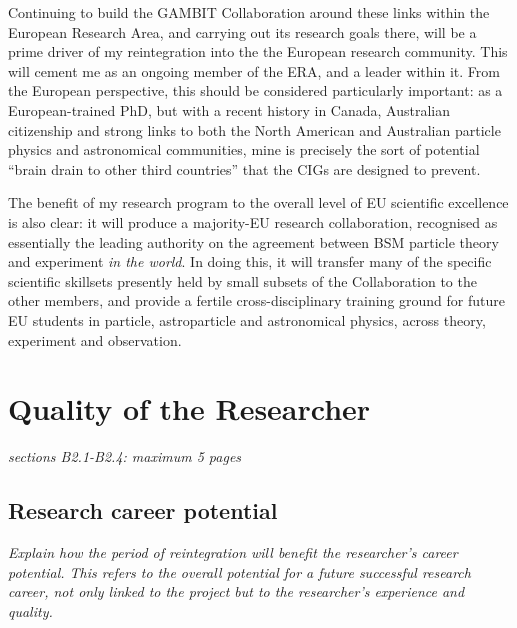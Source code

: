 \documentclass[a4paper,11pt]{article}
\newenvironment{xcomment}{\em}{}
\begin{document}
Continuing to build the GAMBIT Collaboration around these links within the European Research Area, and carrying out its research goals there, will be a prime driver of my reintegration into the the European research community.  This will cement me as an ongoing member of the ERA, and a leader within it.  From the European perspective, this should be considered particularly important: as a European-trained PhD, but with a recent history in Canada, Australian citizenship and strong links to both the North American and Australian particle physics and astronomical communities, mine is precisely the sort of potential ``brain drain to other third countries'' that the CIGs are designed to prevent.

The benefit of my research program to the overall level of EU scientific excellence is also clear: it will produce a majority-EU research collaboration, recognised as essentially the leading authority on the agreement between BSM particle theory and experiment \textit{in the world}.  In doing this, it will transfer many of the specific scientific skillsets presently held by small subsets of the Collaboration to the other members, and provide a fertile cross-disciplinary training ground for future EU students in particle, astroparticle and astronomical physics, across theory, experiment and observation.

\newpage
\section{Quality of the Researcher}
\begin{xcomment}  
sections B2.1-B2.4: maximum 5 pages
\end{xcomment}

\subsection{Research career potential}

\begin{xcomment}
Explain how the period of reintegration will benefit the researcher's
career potential. This refers to the overall potential for a future
successful research career, not only linked to the project but to the
researcher's experience and quality.
\end{xcomment}
\end{document}
